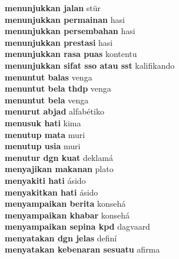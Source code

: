 \textbf{ menunjukkan jalan  } stür \\
\textbf{ menunjukkan permainan  } hasi \\
\textbf{ menunjukkan persembahan  } hasi \\
\textbf{ menunjukkan prestasi  } hasi \\
\textbf{ menunjukkan rasa puas  } kontentu \\
\textbf{ menunjukkan sifat sso atau sst  } kalifikando \\
\textbf{ menuntut balas  } venga \\
\textbf{ menuntut bela thdp  } venga \\
\textbf{ menuntut bela  } venga \\
\textbf{ menurut abjad  } alfabétiko \\
\textbf{ menusuk hati  } kima \\
\textbf{ menutup mata  } muri \\
\textbf{ menutup usia  } muri \\
\textbf{ menutur dgn kuat  } deklamá \\
\textbf{ menyajikan makanan  } plato \\
\textbf{ menyakiti hati  } ásido \\
\textbf{ menyakitkan hati  } ásido \\
\textbf{ menyampaikan berita  } konsehá \\
\textbf{ menyampaikan khabar  } konsehá \\
\textbf{ menyampaikan sepina kpd  } dagvaard \\
\textbf{ menyatakan dgn jelas  } definí \\
\textbf{ menyatakan kebenaran sesuatu  } afirma \\
